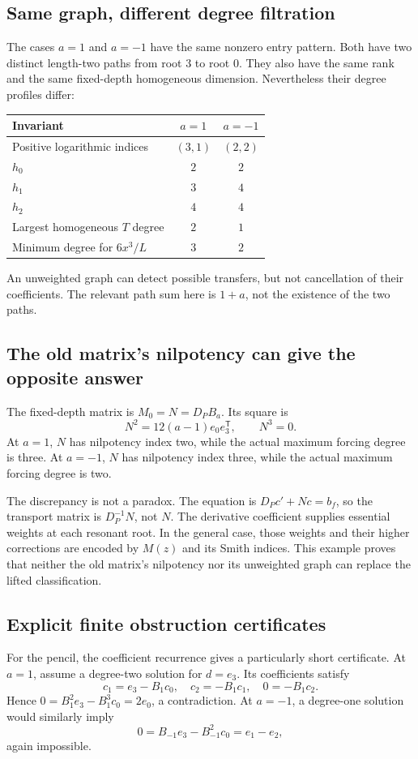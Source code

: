 \documentclass[11pt,a4paper]{article}
\numberwithin{equation}{section}
\theoremstyle{definition}
\theoremstyle{remark}
\theoremstyle{definition}
\begin{document}
\subsection{Same graph, different degree filtration}
The cases $a=1$ and $a=-1$ have the same nonzero entry pattern. Both have two distinct length-two paths from root $3$ to root $0$. They also have the same rank and the same fixed-depth homogeneous dimension. Nevertheless their degree profiles differ:
\begin{center}
\begin{tabular}{lcc}
\toprule
Invariant & $a=1$ & $a=-1$\\
\midrule
Positive logarithmic indices & $(3,1)$ & $(2,2)$\\
$h_0$ & $2$ & $2$\\
$h_1$ & $3$ & $4$\\
$h_2$ & $4$ & $4$\\
Largest homogeneous $T$ degree & $2$ & $1$\\
Minimum degree for $6x^3/L$ & $3$ & $2$\\
\bottomrule
\end{tabular}
\end{center}
An unweighted graph can detect possible transfers, but not cancellation of their coefficients. The relevant path sum here is $1+a$, not the existence of the two paths.

\subsection{The old matrix's nilpotency can give the opposite answer}
The fixed-depth matrix is $M_0=N=D_PB_a$. Its square is
\begin{equation}
 N^2=12(a-1)e_0e_3^{\mathsf T},\qquad N^3=0.
 \label{eq:old-wrong-square}
\end{equation}
At $a=1$, $N$ has nilpotency index two, while the actual maximum forcing degree is three. At $a=-1$, $N$ has nilpotency index three, while the actual maximum forcing degree is two.

The discrepancy is not a paradox. The equation is $D_Pc'+Nc=b_f$, so the transport matrix is $D_P^{-1}N$, not $N$. The derivative coefficient supplies essential weights at each resonant root. In the general case, those weights and their higher corrections are encoded by $M(z)$ and its Smith indices. This example proves that neither the old matrix's nilpotency nor its unweighted graph can replace the lifted classification.

\subsection{Explicit finite obstruction certificates}
For the pencil, the coefficient recurrence gives a particularly short certificate. At $a=1$, assume a degree-two solution for $d=e_3$. Its coefficients satisfy
\[
 c_1=e_3-B_1c_0,\quad c_2=-B_1c_1,
 \quad 0=-B_1c_2.
\]
Hence $0=B_1^2e_3-B_1^3c_0=2e_0$, a contradiction. At $a=-1$, a degree-one solution would similarly imply
\[
 0=B_{-1}e_3-B_{-1}^2c_0=e_1-e_2,
\]
again impossible.
\end{document}
